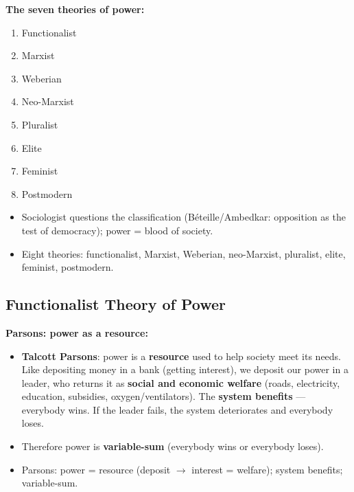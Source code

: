 \begin{DataFact}
\textbf{The seven theories of power:}
\begin{enumerate}
\item Functionalist
\item Marxist
\item Weberian
\item Neo-Marxist
\item Pluralist
\item Elite
\item Feminist
\item Postmodern
\end{enumerate}
\end{DataFact}

\begin{QuickRevision}
\begin{itemize}
\item Sociologist questions the classification (B\'eteille/Ambedkar: opposition as the test of democracy); power = blood of society.
\item Eight theories: functionalist, Marxist, Weberian, neo-Marxist, pluralist, elite, feminist, postmodern.
\end{itemize}
\end{QuickRevision}

\sectiondivider

\subsection{Functionalist Theory of Power}

\begin{KeyConcept}
\textbf{Parsons: power as a resource:}
\begin{itemize}
\item \textbf{Talcott Parsons}: power is a \textbf{resource} used to help society meet its needs. Like depositing money in a bank (getting interest), we deposit our power in a leader, who returns it as \textbf{social and economic welfare} (roads, electricity, education, subsidies, oxygen/ventilators). The \textbf{system benefits} --- everybody wins. If the leader fails, the system deteriorates and everybody loses.
\item Therefore power is \textbf{variable-sum} (everybody wins or everybody loses).
\end{itemize}
\end{KeyConcept}

\begin{QuickRevision}
\begin{itemize}
\item Parsons: power = resource (deposit $\rightarrow$ interest = welfare); system benefits; variable-sum.
\end{itemize}
\end{QuickRevision}

